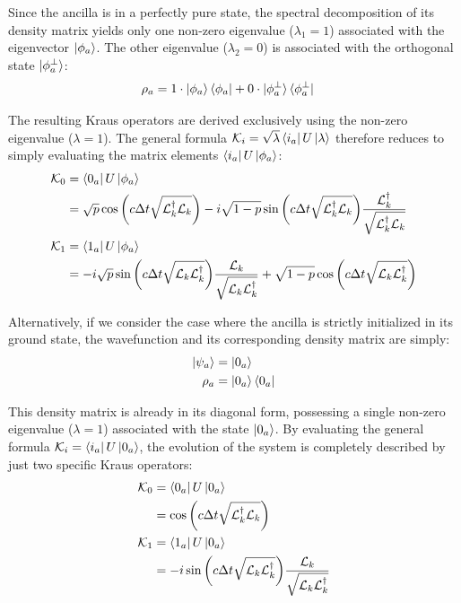 \documentclass[a4paper,12pt]{article}
\begin{document}
Since the ancilla is in a perfectly pure state, the spectral decomposition of its density matrix yields only one non-zero eigenvalue ($\lambda_1 = 1$) associated with the eigenvector $\ket{\phi_a}$. The other eigenvalue ($\lambda_2 = 0$) is associated with the orthogonal state $\ket{\phi_a^\perp}$:
\begin{align}
	\rho_a &= 1 \cdot \ket{\phi_a}\bra{\phi_a} + 0 \cdot \ket{\phi_a^\perp}\bra{\phi_a^\perp}
\end{align}

The resulting Kraus operators are derived exclusively using the non-zero eigenvalue ($\lambda = 1$). The general formula $\mathcal{K}_i = \sqrt{\lambda} \bra{i_a} U \ket{\lambda}$ therefore reduces to simply evaluating the matrix elements $\bra{i_a} U \ket{\phi_a}$:
\begin{align}
	\mathcal{K}_{0} &= \bra{0_a} U \ket{\phi_a} \notag \\
	&= \sqrt{p} \cos{\left(c \Delta t \sqrt{\mathcal{L}_{k}^{\dagger} \mathcal{L}_{k} } \right)} -i \sqrt{1-p} \sin{\left( c \Delta t \sqrt{\mathcal{L}_{k}^{\dagger} \mathcal{L}_{k}} \right)} \frac{\mathcal{L}_{k}^{\dagger}}{\sqrt{\mathcal{L}_{k}^{\dagger} \mathcal{L}_{k}}} \\
	\mathcal{K}_{1} &= \bra{1_a} U \ket{\phi_a} \notag \\
	&= -i \sqrt{p} \sin{\left( c \Delta t \sqrt{\mathcal{L}_{k} \mathcal{L}_{k}^{\dagger}} \right)} \frac{\mathcal{L}_{k}}{\sqrt{\mathcal{L}_{k} \mathcal{L}_{k}^{\dagger}}} + \sqrt{1-p} \cos{\left(c \Delta t \sqrt{\mathcal{L}_{k} \mathcal{L}_{k}^{\dagger} }\right)}
\end{align}

Alternatively, if we consider the case where the ancilla is strictly initialized in its ground state, the wavefunction and its corresponding density matrix are simply:
\begin{align}
	\ket{\psi_a} &= \ket{0_a} \\
	\rho_a &= \ket{0_a}\bra{0_a}
\end{align}

This density matrix is already in its diagonal form, possessing a single non-zero eigenvalue ($\lambda = 1$) associated with the state $\ket{0_a}$. By evaluating the general formula $\mathcal{K}_i = \bra{i_a} U \ket{0_a}$, the evolution of the system is completely described by just two specific Kraus operators:
\begin{align}
	\mathcal{K}_{0} &= \bra{0_a} U \ket{0_a} \notag \\
	&= \cos{\left(c \Delta t \sqrt{\mathcal{L}_{k}^{\dagger} \mathcal{L}_{k} } \right)} \\
	\mathcal{K}_{1} &= \bra{1_a} U \ket{0_a} \notag \\
	&= -i \sin{\left( c \Delta t \sqrt{\mathcal{L}_{k} \mathcal{L}_{k}^{\dagger}} \right)} \frac{\mathcal{L}_{k}}{\sqrt{\mathcal{L}_{k} \mathcal{L}_{k}^{\dagger}}}
\end{align}
\end{document}
